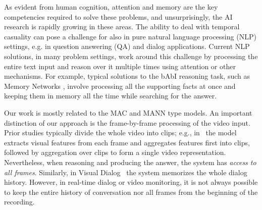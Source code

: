 As evident from human cognition, attention and memory are the key competencies required to solve these problems, and unsurprisingly, the AI research is rapidly growing in these areas.
The ability to deal with temporal casuality can pose a challenge for also in pure natural language processing (NLP) settings, e.g. in question answering (QA) and dialog applications.  
Current NLP solutions, in many problem settings, work around this challenge by processing the entire text input and reason over it multiple times using attention \cite{vaswani2017attention} or other mechanisms.
For example, typical solutions to the bAbI reasoning task, such as Memory Networks \cite{weston2014memory}, involve processing all the supporting facts at once and keeping them in memory all the time while searching for the answer.


Our work is mostly related to the MAC and MANN type models. An important distinction of our approach is the frame-by-frame processing of the video input.
Prior studies typically divide the whole video into clips; e.g., in~\cite{song2018explore} the model extracts visual features from each frame and aggregates features first into clips, followed by aggregation over clips to form a single video representation.
Nevertheless, when reasoning and producing the answer, the system has \textit{access to all frames}.  Similarly, in Visual Dialog~\cite{das2017visual} the system memorizes the whole dialog history. However, in real-time dialog or video monitoring, it is not always possible to keep the entire history of conversation nor all frames from the beginning of the recording.